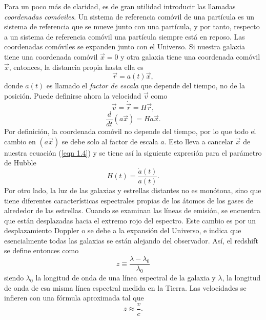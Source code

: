 \documentclass[a4paper,openright,12pt]{book}
\begin{document}
Para un poco más de claridad, es de gran utilidad introducir las llamadas \textit{coordenadas comóviles}. Un sistema de referencia comóvil de una partícula es un sistema de referencia que se mueve junto con una partícula, y por tanto, respecto a un sistema de referencia comóvil una partícula siempre está en reposo. Las coordenadas comóviles se expanden junto con el Universo. Si nuestra galaxia tiene una coordenada comóvil $\vec{x}=0$ y otra galaxia tiene una coordenada comóvil $\vec{x}$, entonces, la distancia propia hasta ella es
\begin{equation}
\vec{r} = a(t)\vec{x},\label{eqn 1.2}
\end{equation}
donde $a(t)$ es llamado el \textit{factor de escala} que depende del tiempo, no de la posición. Puede definirse ahora la velocidad $\vec{v}$ como 
\begin{equation}
\vec{v} = \dot{\vec{r}} = H\vec{r},\label{eqn 1.3}
\end{equation}
\begin{equation}
\frac{d}{dt}(a\vec{x})= Ha\vec{x}.\label{eqn 1.4}
\end{equation} 
Por definición, la coordenada comóvil no depende del tiempo, por lo que todo el cambio en $(a\vec{x})$ se debe solo al factor de escala $a$. Esto lleva a cancelar $\vec{x}$ de nuestra ecuación (\ref{eqn 1.4}) y se tiene así la siguiente expresión para el parámetro de Hubble
\begin{equation}
H(t) = \frac{\dot{a}(t)}{a(t)}.\label{eqn 1.5}
\end{equation}
Por otro lado, la luz de las galaxias y estrellas distantes no es monótona, sino que tiene diferentes características espectrales propias de los átomos de los gases de alrededor de las estrellas. Cuando se examinan las líneas de emisión, se encuentra que están desplazadas hacia el extremo rojo del espectro. Este cambio es por un desplazamiento Doppler o se debe a la expansi\'on del Universo, e indica que esencialmente todas las galaxias se están alejando del observador. Así, el redshift se define entonces como 
\begin{equation}
 z \equiv \frac{\lambda - \lambda_{0}}{\lambda_{0}}\label{eqn 1.6}
\end{equation}
siendo $\lambda_{0}$ la longitud de onda de una línea espectral de la galaxia y $\lambda$, la longitud de onda de esa misma línea espectral medida en la Tierra. Las velocidades se infieren con una fórmula aproximada tal que
\begin{equation*}
z \approx \frac{v}{c}.
\end{equation*}
\end{document}
